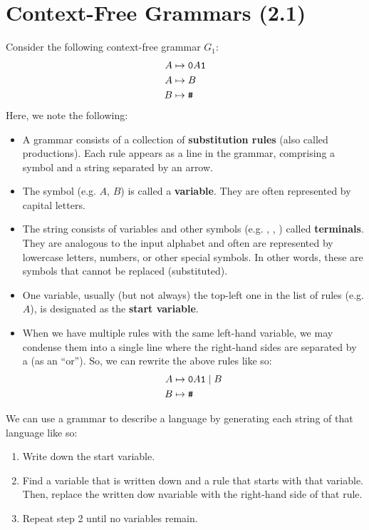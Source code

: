 \documentclass[letterpaper]{article}
\begin{document}
\newpage 
\section{Context-Free Grammars (2.1)}
Consider the following context-free grammar $G_1$:
\begin{equation*}
    \begin{aligned}
        A &\mapsto \texttt{0}A\texttt{1} \\ 
        A &\mapsto B \\ 
        B &\mapsto \texttt{\#}
    \end{aligned}
\end{equation*}
Here, we note the following:  
\begin{itemize}
    \item A grammar consists of a collection of \textbf{substitution rules} (also called productions). Each rule appears as a line in the grammar, comprising a symbol and a string separated by an arrow. 
    \item The symbol (e.g. $A$, $B$) is called a \textbf{variable}. They are often represented by capital letters.  
    \item The string consists of variables and other symbols (e.g. , , \code{\#}) called \textbf{terminals}. They are analogous to the input alphabet and often are represented by lowercase letters, numbers, or other special symbols. In other words, these are symbols that cannot be replaced (substituted). 
    \item One variable, usually (but not always) the top-left one in the list of rules (e.g. $A$), is designated as the \textbf{start variable}.
    \item When we have multiple rules with the same left-hand variable, we may condense them into a single line where the right-hand sides are separated by a \code{|} (as an ``or''). So, we can rewrite the above rules like so: 
    \begin{equation*}
        \begin{aligned}
            A &\mapsto \texttt{0}A\texttt{1} \mid B \\
            B &\mapsto \texttt{\#}
        \end{aligned}
    \end{equation*}
\end{itemize}
We can use a grammar to describe a language by generating each string of that language like so: 
\begin{enumerate}
    \item Write down the start variable. 
    \item Find a variable that is written down and a rule that starts with that variable. Then, replace the written dow nvariable with the right-hand side of that rule. 
    \item Repeat step 2 until no variables remain. 
\end{enumerate}
\end{document}
